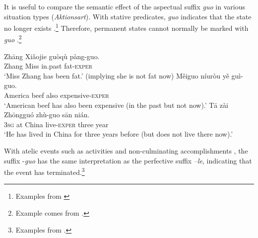 \ea \label{ex:22.42}
\z \z


It is useful to compare the semantic effect of the aspectual suffix \textit{guo} in various situation types (\textit{Aktionsart}). With stative predicates, \textit{guo} indicates that the state no longer exists .\footnote{Examples from \citet[20, 23]{Ma1977}} Therefore, permanent states cannot normally be marked with \textit{guo} .\footnote{Example  comes from \citet[149]{XiaoMcEnery2004}.}


\ea \label{ex:22.43}
\ea \gll  Zhāng  Xiǎojie  guòqù  pàng-guo.\\
Zhang  Miss  in.past  fat-\textsc{exper}\\
\glt ‘Miss Zhang has been fat.’ (implying she is not fat now) 
\ex \gll Měiguo  níuròu  yě  guì-guo.\\
America  beef  also  expensive-\textsc{exper}\\
\glt ‘American beef has also been expensive (in the past but not now).’ 
\ex \gll  Tā  zài  Zhōngguó  zhù-guo  sān  nián.\\
\textsc{3sg}  at  China  live-\textsc{exper} three  year\\
\glt ‘He has lived in China for three years before (but does not live there now).’ 
\z \z

\z


With atelic events such as activities  and non-culminating accomplishments , the suffix -\textit{guo} has the same interpretation as the perfective suffix \textit{–le}, indicating that the event has terminated.\footnote{Examples from \citet[267]{Smith1997}.}


